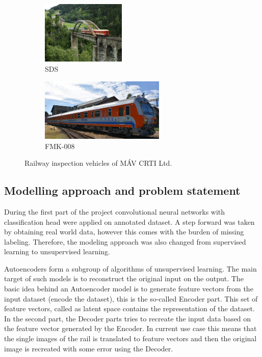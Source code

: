 \begin{figure}[H]
    \centering
    \begin{subfigure}{0.45\textwidth}
        \centering
        \includegraphics[height=3cm]{./tex_images/sds.jpg}
        \caption*{SDS}
    \end{subfigure}
    \begin{subfigure}{0.45\textwidth}
        \centering
        \includegraphics[height=3cm]{./tex_images/FMK008.jpg}
        \caption*{FMK-008}
    \end{subfigure}
    \caption{Railway inspection vehicles of MÁV CRTI Ltd.}
    \label{fig:vehicles}
\end{figure}

\subsection{Modelling approach and problem statement}
During the first part of the project convolutional neural networks with classification head were applied
on annotated dataset.
A step forward was taken by obtaining real world data, however this comes with the burden of
missing labeling.
Therefore, the modeling approach was also changed from supervised learning to unsupervised learning.

Autoencoders form a subgroup of algorithms of unsupervised learning.
The main target of such models is to reconstruct the original input on the output.
The basic idea behind an Autoencoder model is to generate feature vectors from the input
dataset (encode the dataset), this is the so-called Encoder part.
This set of feature vectors, called as latent space contains the representation of the dataset.
In the second part, the Decoder parts tries to recreate the input data based on the feature vector
generated by the Encoder.
In current use case this means that the single images of the rail is translated to feature vectors
and then the original image is recreated with some error using the Decoder.

